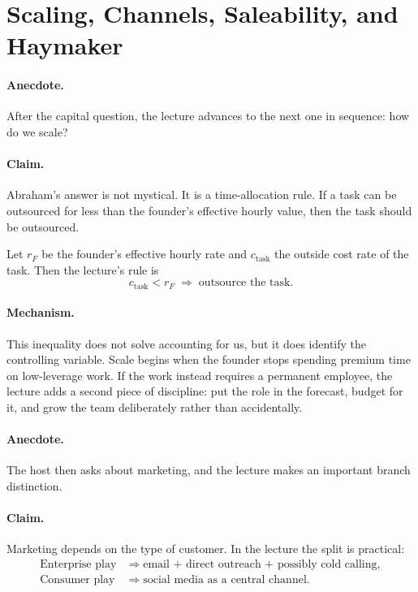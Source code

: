 \section{Scaling, Channels, Saleability, and Haymaker}

\paragraph{Anecdote.} After the capital question, the lecture advances to the next one in sequence: how do we scale?

\paragraph{Claim.} Abraham's answer is not mystical. It is a time-allocation rule. If a task can be outsourced for less than the founder's effective hourly value, then the task should be outsourced.

Let \(r_F\) be the founder's effective hourly rate and \(c_{\text{task}}\) the outside cost rate of the task. Then the lecture's rule is
\begin{equation}
c_{\text{task}} < r_F
\;\Rightarrow\;
\text{outsource the task}.
\end{equation}

\paragraph{Mechanism.} This inequality does not solve accounting for us, but it does identify the controlling variable. Scale begins when the founder stops spending premium time on low-leverage work. If the work instead requires a permanent employee, the lecture adds a second piece of discipline: put the role in the forecast, budget for it, and grow the team deliberately rather than accidentally.

\paragraph{Anecdote.} The host then asks about marketing, and the lecture makes an important branch distinction.

\paragraph{Claim.} Marketing depends on the type of customer. In the lecture the split is practical:
\begin{align}
\text{Enterprise play}
&\Rightarrow
\text{email + direct outreach + possibly cold calling},\\
\text{Consumer play}
&\Rightarrow
\text{social media as a central channel}.
\end{align}

